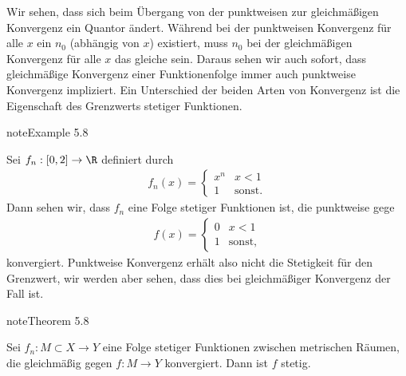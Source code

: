 \documentclass[letterpaper,10pt,english]{jupyterBook}
\begin{document}
Wir sehen, dass sich beim Übergang von der punktweisen zur gleichmäßigen Konvergenz ein Quantor ändert. Während bei der punktweisen Konvergenz für alle \(x\) ein \(n_0\) (abhängig von \(x\)) existiert, muss \(n_0\) bei der gleichmäßigen Konvergenz für alle \(x\) das gleiche sein. Daraus sehen wir auch sofort, dass gleichmäßige Konvergenz einer Funktionenfolge immer auch punktweise Konvergenz impliziert.
Ein Unterschied der beiden Arten von Konvergenz ist die Eigenschaft des Grenzwerts stetiger Funktionen.
\label{stetigkeit/glm:example-4}
\begin{sphinxadmonition}{note}{Example 5.8}



Sei \(f_n: [0,2] \rightarrow \R\) definiert durch
\begin{equation*}
\begin{split} f_n(x) = \left\{ \begin{matrix} x^n & x < 1 \\ 1 & \text{sonst.} \end{matrix} \right.\end{split}
\end{equation*}
Dann sehen wir, dass \(f_n\) eine Folge stetiger Funktionen ist, die punktweise gege
\begin{equation*}
\begin{split} f (x) = \left\{ \begin{matrix} 0 & x < 1 \\ 1 & \text{sonst,} \end{matrix} \right.\end{split}
\end{equation*}
konvergiert. Punktweise Konvergenz erhält also nicht die Stetigkeit für den Grenzwert, wir werden aber sehen, dass dies bei gleichmäßiger Konvergenz der Fall ist.
\end{sphinxadmonition}
\label{stetigkeit/glm:theorem-5}
\begin{sphinxadmonition}{note}{Theorem 5.8}



Sei \(f_n: M \subset X \rightarrow Y\) eine Folge stetiger Funktionen zwischen metrischen Räumen, die gleichmäßig gegen \(f: M \rightarrow Y\) konvergiert. Dann ist \(f\) stetig.
\end{sphinxadmonition}
\end{document}
